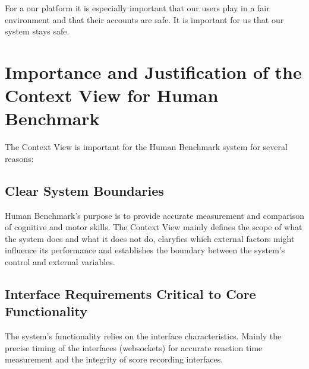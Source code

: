 For a our platform it is especially important that our users play in a fair
environment and that their accounts are safe. It is important for us that our
system stays safe.

\section{Importance and Justification of the Context View for Human Benchmark}

The Context View is important for the Human Benchmark system for several reasons:


\subsection{Clear System Boundaries}

Human Benchmark's purpose is to provide accurate measurement and comparison of
cognitive and motor skills. The Context View mainly defines the scope of
what the system does and what it does not do, claryfies which external factors might influence
its performance and establishes the boundary between the system's control and external variables.




\subsection{Interface Requirements Critical to Core Functionality}

The system's functionality relies on the interface characteristics. 
Mainly the precise timing of the interfaces (websockets) for accurate reaction
time measurement and the integrity of score recording interfaces. 

